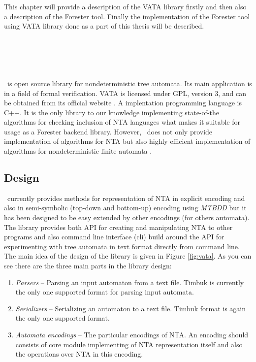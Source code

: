 This chapter will provide a description of the VATA library firstly and then also a description of the Forester tool.
Finally the implementation of the Forester tool using VATA library done as a part of this thesis will be described.

\section{\vata\ }
\label{sec:VATA}

\vata\ is open source library for nondeterministic tree automata.
Its main application is in a field of formal verification.
VATA is licensed under GPL, version 3, and can be obtained from its official website \cite{www:vata}.
A implentation programming language is C++.
It is the only library to our knowledge implementing state-of-the algorithms for checking inclusion of NTA languages
what makes it suitable for usage as a Forester backend library.
However, \vata\ does not only provide implementation of algorithms for NTA but also highly efficient implementation of
algorithms for nondeterministic finite automata \cite{hruska13}.

\subsection{Design}
\vata\ currently provides methods for representation of NTA in explicit encoding and also in semi-symbolic (top-down and bottom-up)
encoding using \emph{MTBDD} but it has been designed to be easy extended by other encodings (for others automata).
The library provides both API for creating and manipulating NTA to other programs and also command line interface (cli) build around
the API for experimenting with tree automata in text format directly from command line.
The main idea of the design of the library is given in Figure \ref{fig:vata}.
As you can see there are the three main parts in the library design:
\begin{enumerate}
	\item \emph{Parsers} -- Parsing an input automaton from a text file.
		Timbuk \cite{timbuk} is currently the only one supported format for parsing input automata.
	\item \emph{Serializers} -- Serializing an automaton to a text file.
		Timbuk format is again the only one supported format.
	\item \emph{Automata encodings} -- The particular encodings of NTA.
		An encoding should consists of core module implementing of NTA representation itself
		and also the operations over NTA in this encoding.
\end{enumerate}

